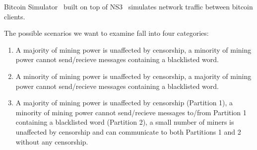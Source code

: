 Bitcoin Simulator~\cite{bitcoin-simulator} built on top of NS3~\cite{NS3} simulates network traffic between bitcoin clients. %

The possible scenarios we want to examine fall into four categories:
\begin{enumerate}
\item A majority of mining power is unaffected by censorship, a minority of mining power cannot send/recieve messages containing a blacklisted word.
\item A minority of mining power is unaffected by censorship, a majority of mining power cannot send/recieve messages containing a blacklisted word.
\item A majority of mining power is unaffected by censorship (Partition 1), a minority of mining power cannot send/recieve messages to/from Partition 1 containing a blacklisted word (Partition 2), a small number of miners is unaffected by censorship and can communicate to both Partitions 1 and 2 without any censorship.
\end{enumerate}
